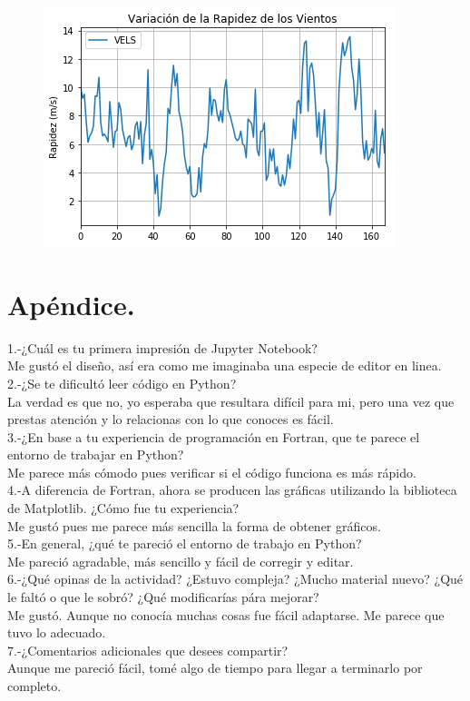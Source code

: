 \documentclass{article}
\begin{document}
\begin{figure}[h!]
    \centering
    \includegraphics[width=\linewidth]{vrv_vs_t.png}
\end{figure}

\section{Apéndice.}
1.-¿Cuál es tu primera impresión de Jupyter Notebook?\\
Me gustó el diseño, así era como me imaginaba una especie de editor en linea.\\
2.-¿Se te dificultó leer código en Python?\\
La verdad es que no, yo esperaba que resultara difícil para mi, pero una vez que prestas atención y lo relacionas con lo que conoces es fácil.\\
3.-¿En base a tu experiencia de programación en Fortran, que te parece el entorno de trabajar en Python?\\
Me parece más cómodo pues verificar si el código funciona es más rápido.\\
4.-A diferencia de Fortran, ahora se producen las gráficas utilizando la biblioteca de Matplotlib. ¿Cómo fue tu experiencia?\\
Me gustó pues me parece más sencilla la forma de obtener gráficos.\\
5.-En general, ¿qué te pareció el entorno de trabajo en Python?\\
Me pareció agradable, más sencillo y fácil de corregir y editar.\\
6.-¿Qué opinas de la actividad? ¿Estuvo compleja? ¿Mucho material nuevo? ¿Qué le faltó o que le sobró? ¿Qué modificarías pára mejorar?\\
Me gustó. Aunque no conocía muchas cosas fue fácil adaptarse. Me parece que tuvo lo adecuado.\\
7.-¿Comentarios adicionales que desees compartir?\\
Aunque me pareció fácil, tomé algo de tiempo para llegar a terminarlo por completo.\\
\end{document}
